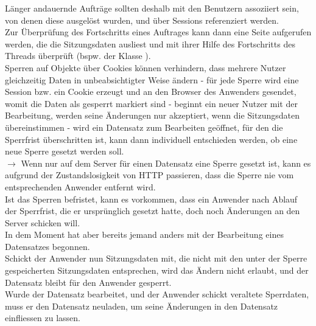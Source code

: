 \noindent
Länger andauernde Aufträge sollten deshalb mit den Benutzern assoziiert sein, von denen diese ausgelöst wurden, und über Sessions referenziert werden.\\

\noindent
Zur Überprüfung des Fortschritts eines Auftrages kann dann eine Seite aufgerufen werden, die die Sitzungsdaten ausliest und mit ihrer Hilfe des Fortschritts des Threads überprüft (bspw.  der Klasse ).\\

\noindent
Sperren auf Objekte über Cookies können verhindern, dass mehrere Nutzer gleichzeitig Daten in unbeabsichtigter Weise ändern - für jede Sperre wird eine Session {bzw.} ein Cookie erzeugt und an den Browser des Anwenders gesendet, womit die Daten als gesperrt markiert sind - beginnt ein neuer Nutzer mit der Bearbeitung, werden seine Änderungen nur akzeptiert, wenn die Sitzungsdaten übereinstimmen - wird ein Datensatz zum Bearbeiten geöffnet, für den die Sperrfrist überschritten ist, kann dann individuell entschieden werden, ob eine neue Sperre gesetzt werden soll.\\

\noindent
$\rightarrow$ Wenn nur auf dem Server für einen Datensatz eine Sperre gesetzt ist, kann es aufgrund der Zustandslosigkeit von HTTP passieren, dass die Sperre nie vom entsprechenden Anwender entfernt wird.\\
Ist das Sperren befristet, kann es vorkommen, dass ein Anwender nach Ablauf der Sperrfrist, die er ursprünglich gesetzt hatte, doch noch Änderungen an den Server schicken will.\\
In dem Moment hat aber bereits jemand anders mit der Bearbeitung eines Datensatzes begonnen.\\
Schickt der Anwender nun Sitzungsdaten mit, die nicht mit den unter der Sperre gespeicherten Sitzungsdaten entsprechen, wird das Ändern nicht erlaubt, und der Datensatz bleibt für den Anwender gesperrt.\\
Wurde der Datensatz bearbeitet, und der Anwender schickt veraltete Sperrdaten, muss er den Datensatz neuladen, um seine Änderungen in den Datensatz einfliessen zu lassen.